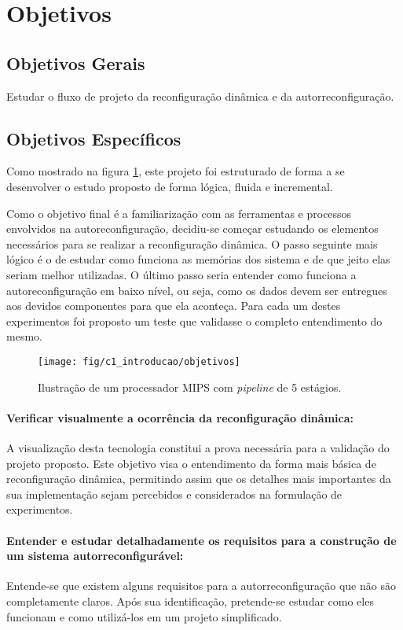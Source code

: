 \documentclass[11pt,a4paper,oneside]{book}
\begin{document}
\section{Objetivos}
\subsection{Objetivos Gerais} Estudar o fluxo de projeto da reconfiguração dinâmica e da autorreconfiguração.

\subsection{Objetivos Específicos}
Como mostrado na figura \ref{fig:objetivos}, este projeto foi estruturado de forma a se desenvolver o estudo proposto de forma lógica, fluida e incremental.

Como o objetivo final é a familiarização com as ferramentas e processos envolvidos na autoreconfiguração, decidiu-se começar estudando os elementos necessários para se realizar a reconfiguração dinâmica.
O passo seguinte mais lógico é o de estudar como funciona as memórias dos sistema e de que jeito elas seriam melhor utilizadas.
O último passo seria entender como funciona a autoreconfiguração em baixo nível, ou seja, como os dados devem ser entregues aos devidos componentes para que ela aconteça.
Para cada um destes experimentos foi proposto um teste que validasse o completo entendimento do mesmo.

\begin{figure}[h]
\centering
\texttt{[image: fig/c1\_introducao/objetivos]}
\caption{Ilustração de um processador MIPS com \textit{pipeline} de 5 estágios.}
\label{fig:objetivos}
\end{figure}

\paragraph{Verificar visualmente a ocorrência da reconfiguração dinâmica:} A visualização desta tecnologia constitui a prova necessária para a validação do projeto proposto.
Este objetivo visa o entendimento da forma mais básica de reconfiguração dinâmica, permitindo assim que os detalhes mais importantes da sua implementação sejam percebidos e considerados na formulação de experimentos.

\paragraph{Entender e estudar detalhadamente os requisitos para a construção de um sistema autorreconfigurável:} Entende-se que existem alguns requisitos para a autorreconfiguração que não são completamente claros. Após sua identificação, pretende-se estudar como eles funcionam e como utilizá-los em um projeto simplificado.
\end{document}
